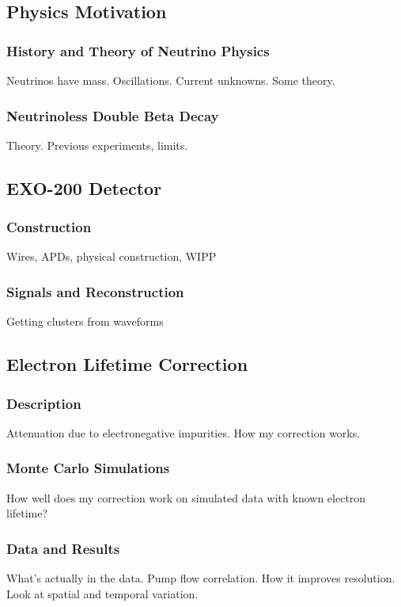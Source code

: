 \documentclass[12pt,letterpaper,onecolumn]{article}
\begin{document}
\subsection{Physics Motivation}

\subsubsection{History and Theory of Neutrino Physics}
Neutrinos have mass. Oscillations. Current unknowns. Some theory.

\subsubsection{Neutrinoless Double Beta Decay}
Theory. Previous experiments, limits.

\subsection{EXO-200 Detector}

\subsubsection{Construction}
Wires, APDs, physical construction, WIPP

\subsubsection{Signals and Reconstruction}
Getting clusters from waveforms

\subsection{Electron Lifetime Correction}

\subsubsection{Description}
Attenuation due to electronegative impurities. How my correction works.

\subsubsection{Monte Carlo Simulations}
How well does my correction work on simulated data with known electron lifetime?

\subsubsection{Data and Results}
What's actually in the data. Pump flow correlation. How it improves resolution. Look at spatial and temporal variation.
\end{document}
